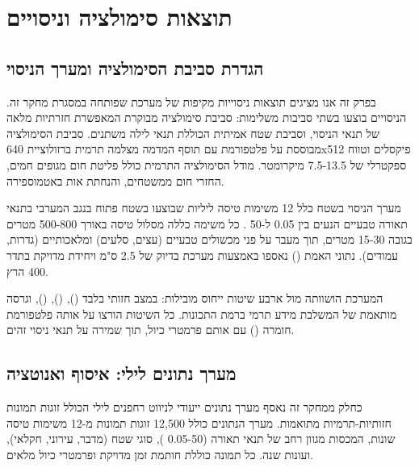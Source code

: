 
\section{תוצאות סימולציה וניסויים}
\label{sec:ch08_results}

\subsection{הגדרת סביבת הסימולציה ומערך הניסוי}
\label{sec:ch08_experimental_setup}

בפרק זה אנו מציגים תוצאות ניסוייות מקיפות של מערכת  שפותחה במסגרת מחקר זה. הניסויים בוצעו בשתי סביבות משלימות: סביבת סימולציה מבוקרת המאפשרת חזרתיות מלאה של תנאי הניסוי, וסביבת שטח אמיתית הכוללת תנאי לילה משתנים. סביבת הסימולציה מבוססת על פלטפורמת  עם תוסף  המדמה מצלמה תרמית ברזולוציית 640x512 פיקסלים וטווח ספקטרלי של 7.5-13.5 מיקרומטר. מודל הסימולציה התרמית כולל פליטת חום מגופים חמים, החזרי חום ממשטחים, והנחתת אות באטמוספירה.

מערך הניסוי בשטח כלל 12 משימות טיסה ליליות שבוצעו בשטח פתוח בנגב המערבי בתנאי תאורה טבעיים הנעים בין 0.05 ל-50 . כל משימה כללה מסלול טיסה באורך 500-800 מטרים בגובה 15-30 מטרים, תוך מעבר על פני מכשולים טבעיים (עצים, סלעים) ומלאכותיים (גדרות, עמודים). נתוני האמת () נאספו באמצעות מערכת  בדיוק של 2.5 ס"מ ויחידת  מדויקת בתדר 400 הרץ.

המערכת הושוותה מול ארבע שיטות ייחוס מובילות:  במצב חזותי בלבד (\cite{MurArtal2015ORB}),  (\cite{Kalman1960}),  (\cite{Zhang2014LOAM}), וגרסה מותאמת של  המשלבת מידע תרמי ברמת התכונות. כל השיטות הורצו על אותה פלטפורמת חומרה () עם אותם פרמטרי כיול, תוך שמירה על תנאי ניסוי זהים.

\subsection{מערך נתונים לילי: איסוף ואנוטציה}
\label{sec:ch08_dataset}

כחלק ממחקר זה נאסף מערך נתונים ייעודי לניווט רחפנים לילי הכולל זוגות תמונות חזותיות-תרמיות מתואמות. מערך הנתונים כולל 12,500 זוגות תמונות מ-12 משימות טיסה שונות, המכסות מגוון רחב של תנאי תאורה (0.05-50 ), סוגי שטח (מדבר, עירוני, חקלאי), ועונות שנה. כל תמונה כוללת חותמת זמן מדויקת ופרמטרי כיול מלאים.


